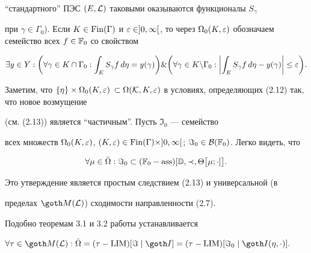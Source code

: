 ``стандартного'' ПЭС $(E, {\cal L})$ таковыми оказываются функционалы $S_\gamma$


при $\gamma \in \Gamma_0$). Если $K \in \Fin(\Gamma)$ и $\var \in


]0,\infty[$, то через $\Omega_0(K, \var)$ обозначаем семейство всех $f


\in {\Bbb F}_0$ со свойством


%


\begin{equation}


\exists y \in Y:\biggl(\forall \gamma \in K \cap \Gamma_0:


\int_E S_\gamma f\,d\eta = y(\gamma)\biggr) \&


\biggl(\forall \gamma \in K \backslash \Gamma_0:


\biggl| \int_E S_\gamma f\,d\eta - y(\gamma)\biggr| \le \var\biggr).


\end{equation}


%


Заметим, что $\{\eta\} \times \Omega_0(K, \var)$ $\subset \Omega({\cal K},


K, \var)$ в условиях, определяющих (2.12) так, что новое возмущение


(см. (2.13)) является ``частичным''. Пусть $\Im_0$ --- семейство


всех множеств $\Omega_0(K, \var)$, $(K, \var) \in \Fin(\Gamma) \times


]0,\infty[$; $\Im_0 \in {\cal B}({\Bbb F}_0)$. Легко видеть, что


%


\begin{equation}


\forall \mu \in \tilde\Omega: \Im_0 \subset ({\Bbb F}_0


- \ass)[{\Bbb D}, \prec, \Theta\bigl[\mu; \cdot]\bigr].


\end{equation}


%


Это утверждение является простым следствием (2.13) и универсальной (в


пределах ${\goth M}({\cal L})$) сходимости направленности (2.7).


Подобно теоремам 3.1 и 3.2 работы \cite{Ch4} устанавливается





\begin{thms} $\forall \tau \in {\goth M}({\cal L}): \tilde\Omega =


(\tau - \LIM)[\Im \mid {\goth I}] = (\tau - \LIM)[\Im_0 \mid {\goth


I}(\eta, \cdot)].$


\end{thms}





